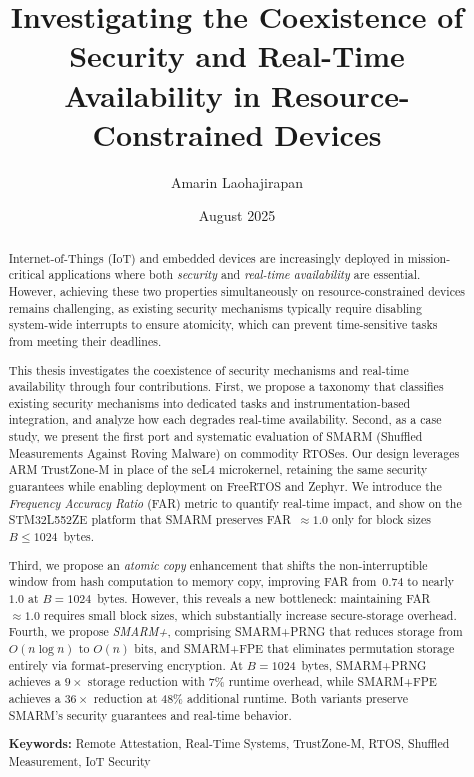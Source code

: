 \documentclass[a4paper,10pt]{article}
\title{Investigating the Coexistence of Security and Real-Time Availability in Resource-Constrained Devices}
\author{Amarin Laohajirapan}
\date{August 2025}
\begin{document}
\maketitle

\begin{abstract}
Internet-of-Things (IoT) and embedded devices are increasingly deployed
in mission-critical applications where both \emph{security} and
\emph{real-time availability} are essential. However, achieving these
two properties simultaneously on resource-constrained devices remains
challenging, as existing security mechanisms typically require
disabling system-wide interrupts to ensure atomicity, which can prevent
time-sensitive tasks from meeting their deadlines.

This thesis investigates the coexistence of security mechanisms and
real-time availability through four contributions. First, we propose a
taxonomy that classifies existing security mechanisms into dedicated
tasks and instrumentation-based integration, and analyze how each
degrades real-time availability. Second, as a case study, we present
the first port and systematic evaluation of SMARM (Shuffled Measurements
Against Roving Malware) on commodity RTOSes. Our design leverages ARM
TrustZone-M in place of the seL4 microkernel, retaining the same
security guarantees while enabling deployment on FreeRTOS and Zephyr.
We introduce the \emph{Frequency Accuracy Ratio} (FAR) metric to quantify
real-time impact, and show on the STM32L552ZE platform that SMARM
preserves FAR~$\approx 1.0$ only for block sizes $B \leq 1024$~bytes.

Third, we propose an \emph{atomic copy} enhancement that shifts the
non-interruptible window from hash computation to memory copy, improving
FAR from~$0.74$ to nearly~$1.0$ at $B = 1024$~bytes. However, this
reveals a new bottleneck: maintaining FAR~$\approx 1.0$ requires small
block sizes, which substantially increase secure-storage overhead.
Fourth, we propose \emph{SMARM+}, comprising SMARM+PRNG
that reduces storage from $O(n \log n)$ to $O(n)$ bits, and
SMARM+FPE that eliminates permutation storage entirely
via format-preserving encryption. At $B = 1024$~bytes,
SMARM+PRNG achieves a $9\times$ storage reduction with
7\% runtime overhead, while SMARM+FPE achieves a
$36\times$ reduction at 48\% additional runtime. Both variants preserve
SMARM's security guarantees and real-time behavior.

\noindent\textbf{Keywords:} Remote Attestation, Real-Time Systems,
TrustZone-M, RTOS, Shuffled Measurement, IoT Security
\end{abstract}
\end{document}
